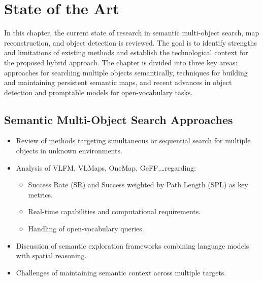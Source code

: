 \chapter{State of the Art}

In this chapter, the current state of research in semantic multi-object search, map reconstruction, and object detection is reviewed. The goal is to identify strengths and limitations of existing methods and establish the technological context for the proposed hybrid approach. The chapter is divided into three key areas: approaches for searching multiple objects semantically, techniques for building and maintaining persistent semantic maps, and recent advances in object detection and promptable models for open-vocabulary tasks.

\section{Semantic Multi-Object Search Approaches}
\begin{itemize}
    \item Review of methods targeting simultaneous or sequential search for multiple objects in unknown environments.
    \item Analysis of VLFM, VLMaps, OneMap, GeFF,\dots regarding:
    \begin{itemize}
        \item Success Rate (SR) and Success weighted by Path Length (SPL) as key metrics.
        \item Real-time capabilities and computational requirements.
        \item Handling of open-vocabulary queries.
    \end{itemize}
    \item Discussion of semantic exploration frameworks combining language models with spatial reasoning.
    \item Challenges of maintaining semantic context across multiple targets.
\end{itemize}

